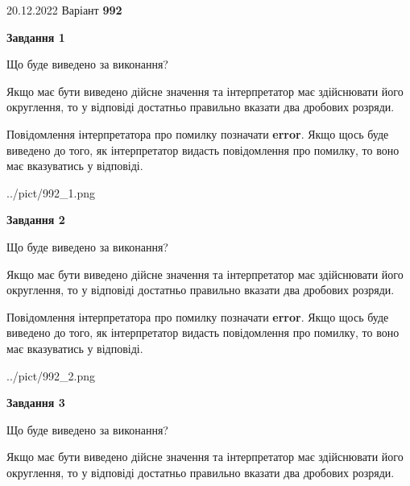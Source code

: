 \documentclass[12pt, ukrainian]{article}
\begin{document}
{20.12.2022 Варіант \No \textbf { 992 }\par}
{
\begin {Large}

{\begin {center}\textbf{Завдання 1}\end {center}}\par
Що буде виведено за виконання? \par

Якщо має бути виведено дійсне значення та інтерпретатор має здійснювати його округлення, 
то у відповіді достатньо правильно вказати два дробових розряди.

Повідомлення інтерпретатора про помилку позначати \textbf{error}.
Якщо щось буде виведено до того, як інтерпретатор видасть повідомлення про помилку, 
то воно має вказуватись у відповіді. \par

\begin{center}
	{../pict/992_1.png}
\end{center}
\newpage

{\begin {center}\textbf{Завдання 2}\end {center}}\par
Що буде виведено за виконання? \par

Якщо має бути виведено дійсне значення та інтерпретатор має здійснювати його округлення, 
то у відповіді достатньо правильно вказати два дробових розряди.

Повідомлення інтерпретатора про помилку позначати \textbf{error}.
Якщо щось буде виведено до того, як інтерпретатор видасть повідомлення про помилку, 
то воно має вказуватись у відповіді. \par

\begin{center}
	{../pict/992_2.png}
\end{center}
\newpage

{\begin {center}\textbf{Завдання 3}\end {center}}\par
Що буде виведено за виконання? \par

Якщо має бути виведено дійсне значення та інтерпретатор має здійснювати його округлення, 
то у відповіді достатньо правильно вказати два дробових розряди.


\end{Large}}
\end{document}
